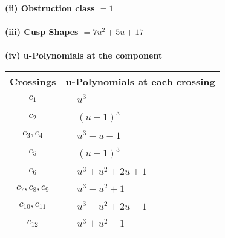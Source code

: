 \documentclass[1p]{elsarticle_modified}
\theoremstyle{definition}
\begin{document}
\flushleft \textbf{(ii) Obstruction class $= 1$}\\~\\
\flushleft \textbf{(iii) Cusp Shapes $= 7 u^2+5 u+17$}\\~\\
\newpage\renewcommand{\arraystretch}{1}
\flushleft \textbf{(iv) u-Polynomials at the component}\newline \\
\begin{tabular}{m{50pt}|m{274pt}}
Crossings & \hspace{64pt}u-Polynomials at each crossing \\
\hline $$\begin{aligned}c_{1}\end{aligned}$$&$\begin{aligned}
&u^3
\end{aligned}$\\
\hline $$\begin{aligned}c_{2}\end{aligned}$$&$\begin{aligned}
&(u+1)^3
\end{aligned}$\\
\hline $$\begin{aligned}c_{3},c_{4}\end{aligned}$$&$\begin{aligned}
&u^3- u-1
\end{aligned}$\\
\hline $$\begin{aligned}c_{5}\end{aligned}$$&$\begin{aligned}
&(u-1)^3
\end{aligned}$\\
\hline $$\begin{aligned}c_{6}\end{aligned}$$&$\begin{aligned}
&u^3+u^2+2 u+1
\end{aligned}$\\
\hline $$\begin{aligned}c_{7},c_{8},c_{9}\end{aligned}$$&$\begin{aligned}
&u^3- u^2+1
\end{aligned}$\\
\hline $$\begin{aligned}c_{10},c_{11}\end{aligned}$$&$\begin{aligned}
&u^3- u^2+2 u-1
\end{aligned}$\\
\hline $$\begin{aligned}c_{12}\end{aligned}$$&$\begin{aligned}
&u^3+u^2-1
\end{aligned}$\\
\hline
\end{tabular}\\~\\
\end{document}
